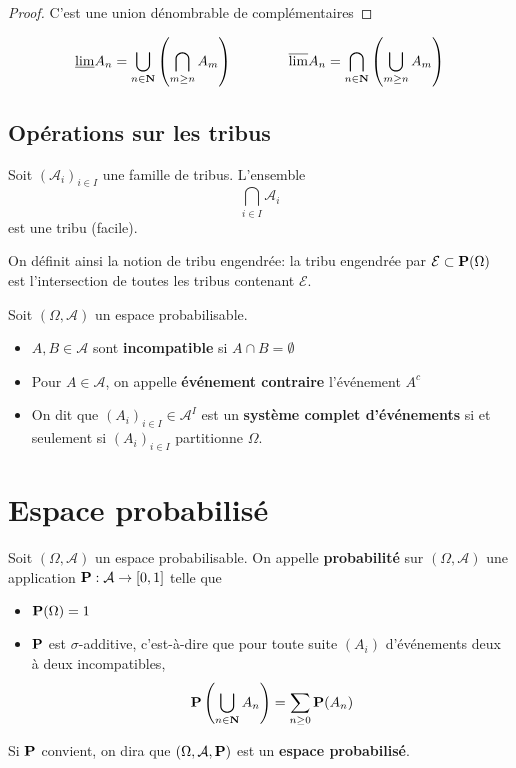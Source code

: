 \begin{proof}
    C'est une union dénombrable de complémentaires
\end{proof}

\begin{notation}[HP]
    \[
        \underline{\lim}A_n=\bigcup_{n\in\N} \left( \bigcap_{m\geq n} A_m \right) \qquad \qquad \overline{\lim} A_n=\bigcap_{n\in\N} \left( \bigcup_{m\geq n}A_m \right) 
    \]
\end{notation}

\subsection{Opérations sur les tribus}

Soit $(\mathcal A_i)_{i\in I}$ une famille de tribus. L'ensemble \[
    \bigcap_{i\in I}\mathcal A_i
\]
est une tribu (facile).

\begin{rem}
    On définit ainsi la notion de tribu engendrée: la tribu engendrée par $\mathcal E\subset \mathcal \P(\Omega)$ est l'intersection de toutes les tribus contenant $\mathcal E$.
\end{rem}

\begin{dfn}
    Soit $(\Omega, \mathcal A)$ un espace probabilisable. \begin{itemize}
        \item $A,B\in \mathcal A$ sont \textbf{incompatible} si $A \cap B=\emptyset$
        \item Pour $A\in \mathcal A$, on appelle  \textbf{événement contraire} l'événement $A^c$
        \item On dit que $(A_i)_{i\in I} \in  \mathcal A^I$ est un \textbf{système complet d'événements} si et seulement si $(A_i)_{i\in I}$ partitionne $\Omega$.
    \end{itemize}
\end{dfn}

\section{Espace probabilisé}

\begin{dfn}
    Soit $(\Omega, \mathcal A)$ un espace probabilisable. On appelle \textbf{probabilité} sur $(\Omega, \mathcal A)$ une application $\P:\mathcal A \to  [0, 1]$ telle que \begin{itemize}
        \item $\P(\Omega)=1$
        \item $\P$ est $\sigma$-additive, c'est-à-dire que pour toute suite $(A_i)$ d'événements deux à deux incompatibles, \[
                \P \left( \bigcup_{n\in\N}A_n \right) =\sum_{n\geq 0}\P(A_n)
        \]
    \end{itemize}
    Si $\P$ convient, on dira que $(\Omega, \mathcal A, \P)$ est un \textbf{espace probabilisé}.
\end{dfn}


